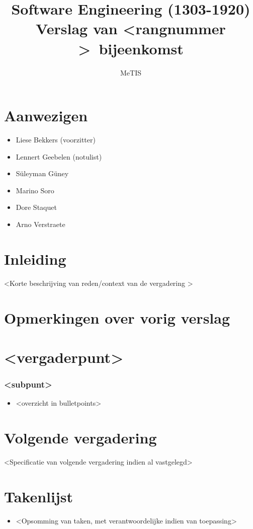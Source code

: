 \documentclass{article}
\title{Software Engineering (1303-1920)\\Verslag van \textless rangnummer \textgreater \ bijeenkomst}
\author{MeTIS}
\date{}
\begin{document}
\maketitle

\section*{Aanwezigen}
\begin{itemize}
    \item Liese Bekkers (voorzitter)
    \item Lennert Geebelen (notulist)
    \item S\"uleyman G\"uney
    \item Marino Soro
    \item Dore Staquet
    \item Arno Verstraete
\end{itemize}

\section*{Inleiding}
\textless Korte beschrijving van reden/context van de vergadering \textgreater

\section*{Opmerkingen over vorig verslag}

\section*{\textless vergaderpunt\textgreater}
\subsubsection*{\textless subpunt\textgreater}
\begin{itemize}
    \item \textless overzicht in bulletpoints\textgreater
\end{itemize}

\section*{Volgende vergadering}
\textless Specificatie van volgende vergadering indien al vastgelegd\textgreater

\section*{Takenlijst}
\begin{itemize}
	\item \textless Opsomming van taken, met verantwoordelijke indien van toepassing\textgreater
\end{itemize}
\end{document}
